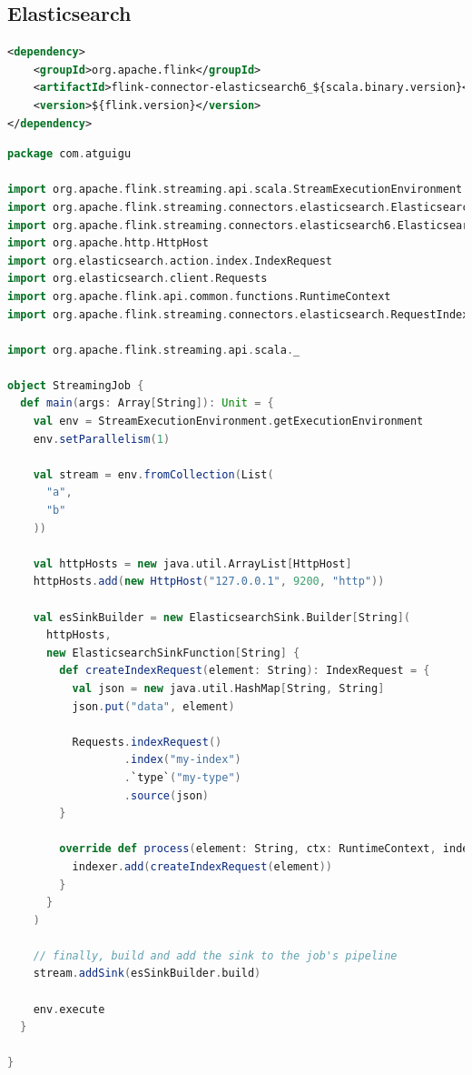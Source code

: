\documentclass[oneside]{ctexbook}
\begin{document}
\subsection{Elasticsearch}

\begin{lstlisting}[language=xml]
<dependency>
    <groupId>org.apache.flink</groupId>
    <artifactId>flink-connector-elasticsearch6_${scala.binary.version}</artifactId>
    <version>${flink.version}</version>
</dependency>
\end{lstlisting}

\begin{lstlisting}[language=scala]
package com.atguigu

import org.apache.flink.streaming.api.scala.StreamExecutionEnvironment
import org.apache.flink.streaming.connectors.elasticsearch.ElasticsearchSinkFunction
import org.apache.flink.streaming.connectors.elasticsearch6.ElasticsearchSink
import org.apache.http.HttpHost
import org.elasticsearch.action.index.IndexRequest
import org.elasticsearch.client.Requests
import org.apache.flink.api.common.functions.RuntimeContext
import org.apache.flink.streaming.connectors.elasticsearch.RequestIndexer

import org.apache.flink.streaming.api.scala._

object StreamingJob {
  def main(args: Array[String]): Unit = {
    val env = StreamExecutionEnvironment.getExecutionEnvironment
    env.setParallelism(1)

    val stream = env.fromCollection(List(
      "a",
      "b"
    ))

    val httpHosts = new java.util.ArrayList[HttpHost]
    httpHosts.add(new HttpHost("127.0.0.1", 9200, "http"))

    val esSinkBuilder = new ElasticsearchSink.Builder[String](
      httpHosts,
      new ElasticsearchSinkFunction[String] {
        def createIndexRequest(element: String): IndexRequest = {
          val json = new java.util.HashMap[String, String]
          json.put("data", element)

          Requests.indexRequest()
                  .index("my-index")
                  .`type`("my-type")
                  .source(json)
        }

        override def process(element: String, ctx: RuntimeContext, indexer: RequestIndexer): Unit = {
          indexer.add(createIndexRequest(element))
        }
      }
    )

    // finally, build and add the sink to the job's pipeline
    stream.addSink(esSinkBuilder.build)

    env.execute
  }

}
\end{lstlisting}
\end{document}
